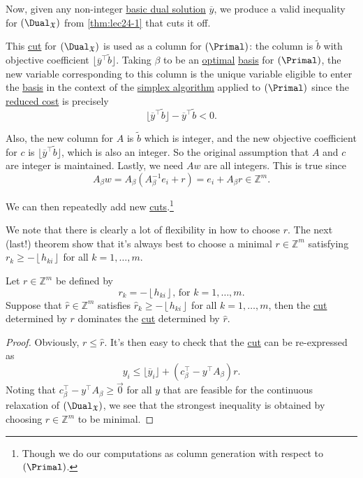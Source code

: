 Now, given any non-integer \hyperref[def:dual-basic-solution]{basic dual solution} \(\overline{y}\), we produce a valid inequality for \((\Dual_{\mathfrak{X}})\) from \autoref{thm:lec24-1} that cuts it off.
\begin{note}
	This \hyperref[def:Chvatal-Gomory-cut]{cut} for \((\Dual_{\mathfrak{X}})\) is used as a column for \((\Primal)\): the column is \(\widetilde{b} \) with objective coefficient \(\lfloor \overline{y} ^{\top} \widetilde{b} \rfloor\). Taking \(\beta\) to be an \hyperref[def:optimal-solution]{optimal} \hyperref[def:basis]{basis} for \((\Primal)\), the new variable corresponding to this column is the unique variable eligible to enter the \hyperref[def:basis]{basis} in the context of the \hyperref[algo:simplex-algorithm]{simplex algorithm} applied to \((\Primal)\) since the \hyperref[def:reduced-cost]{reduced cost} is precisely
	\[
		\lfloor \overline{y} ^{\top} \widetilde{b} \rfloor-\overline{y} ^{\top} \widetilde{b} < 0.
	\]

	Also, the new column for \(A\) is \(\widetilde{b} \) which is integer, and the new objective coefficient for \(c\) is \(\lfloor \overline{y} ^{\top} \widetilde{b} \rfloor\), which is also an integer. So the original assumption that \(A\) and \(c\) are integer is maintained. Lastly, we need \(Aw\) are all integers. This is true since
	\[
		A_{\beta}w = A_{\beta}\left(A^{-1}_{\beta}e_{i}+r\right) = e_{i}+A_{\beta}r \in \mathbb{Z}^m.
	\]

	We can then repeatedly add new \hyperref[def:Chvatal-Gomory-cut]{cuts}.\footnote{Though we do our computations as column generation with respect to \((\Primal)\).}
\end{note}

We note that there is clearly a lot of flexibility in how to choose \(r\). The next (last!) theorem show that it's always best to choose a minimal \(r\in \mathbb{Z} ^m\)  satisfying \(r_k \geq -\left\lfloor h_{ki} \right\rfloor\) for all \(k = 1, \dots  , m\).

\begin{theorem}\label{thm:lec24-3}
	Let \(r\in \mathbb{Z} ^m\) be defined by
	\[
		r_k = -\left\lfloor h_{ki} \right\rfloor\text{, for }k = 1, \dots , m.
	\]
	Suppose that \(\hat{r} \in \mathbb{Z} ^m\) satisfies \(\hat{r}_k \geq -\left\lfloor h_{ki} \right\rfloor\) for all \(k = 1, \dots , m\), then the \hyperref[def:Chvatal-Gomory-cut]{cut} determined by \(r\) dominates the \hyperref[def:Chvatal-Gomory-cut]{cut} determined by \(\hat{r} \).
\end{theorem}
\begin{proof}
	Obviously, \(r \leq \hat{r} \). It's then easy to check that the \hyperref[def:Chvatal-Gomory-cut]{cut} can be re-expressed as
	\[
		y_{i} \leq \lfloor \overline{y} _{i} \rfloor + (c^{\top} _\beta - y^{\top} A_\beta )r.
	\]
	Noting that \(c^{\top} _\beta - y^{\top} A_\beta \geq \vec{0} \) for all \(y\) that are feasible for the continuous relaxation of \((\Dual_{\mathfrak{X}})\), we see that the strongest inequality is obtained by choosing \(r\in\mathbb{Z} ^m\) to be minimal.
\end{proof}

